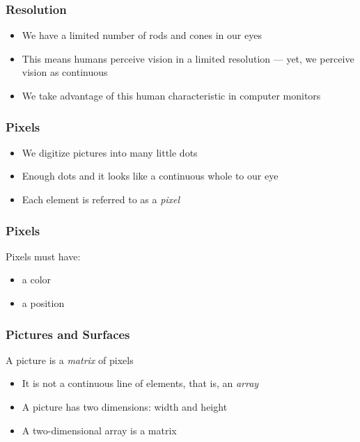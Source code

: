 
\begin{frame}
	\frametitle{Resolution}
	\begin{itemize}
		\item We have a limited number of rods and cones in our eyes
		\item This means humans perceive vision in a limited resolution --- yet, we perceive vision as continuous
		\item We take advantage of this human characteristic in computer monitors
	\end{itemize}
\end{frame}


\begin{frame}
	\frametitle{Pixels}
	\begin{itemize}
		\item We digitize pictures into many little dots
		\item Enough dots and it looks like a continuous whole to our eye
		\item Each element is referred to as a \textit{pixel}
	\end{itemize}
\end{frame}

\begin{frame}
	\frametitle{Pixels}
	
	Pixels must have:
	
	\begin{itemize}
		\item a color
		\item a position
	\end{itemize}
\end{frame}

\begin{frame}
	\frametitle{Pictures and Surfaces}
	
	A picture is a \textit{matrix} of pixels
	
	\begin{itemize}
		\item It is not a continuous line of elements, that is, an \textit{array}
		\item A picture has two dimensions: width and height
		\item A two-dimensional array is a matrix
	\end{itemize}
\end{frame}


